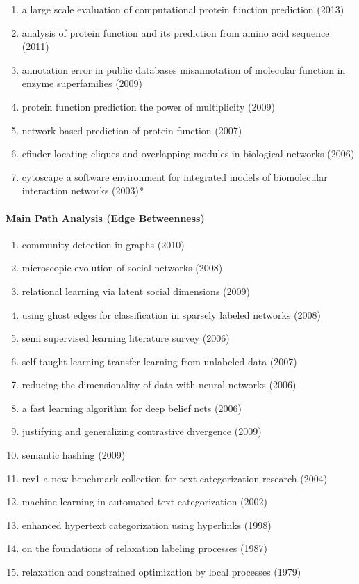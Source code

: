 \documentclass[lettepaper,]{article}
\providecommand{\tightlist}{%
  \setlength{\itemsep}{0pt}\setlength{\parskip}{0pt}}
\let\oldparagraph\paragraph
\renewcommand{\paragraph}[1]{\oldparagraph{#1}\mbox{}}
\begin{document}
\begin{enumerate}
\def\labelenumi{\arabic{enumi}.}
\tightlist
\item
  a large scale evaluation of computational protein function prediction
  (2013)
\item
  analysis of protein function and its prediction from amino acid
  sequence (2011)
\item
  annotation error in public databases misannotation of molecular
  function in enzyme superfamilies (2009)
\item
  protein function prediction the power of multiplicity (2009)
\item
  network based prediction of protein function (2007)
\item
  cfinder locating cliques and overlapping modules in biological
  networks (2006)
\item
  cytoscape a software environment for integrated models of biomolecular
  interaction networks (2003)*
\end{enumerate}

\hypertarget{main-path-analysis-edge-betweenness}{%
\paragraph{Main Path Analysis (Edge
Betweenness)}\label{main-path-analysis-edge-betweenness}}

\begin{enumerate}
\def\labelenumi{\arabic{enumi}.}
\tightlist
\item
  community detection in graphs (2010)
\item
  microscopic evolution of social networks (2008)
\item
  relational learning via latent social dimensions (2009)
\item
  using ghost edges for classification in sparsely labeled networks
  (2008)
\item
  semi supervised learning literature survey (2006)
\item
  self taught learning transfer learning from unlabeled data (2007)
\item
  reducing the dimensionality of data with neural networks (2006)
\item
  a fast learning algorithm for deep belief nets (2006)
\item
  justifying and generalizing contrastive divergence (2009)
\item
  semantic hashing (2009)
\item
  rcv1 a new benchmark collection for text categorization research
  (2004)
\item
  machine learning in automated text categorization (2002)
\item
  enhanced hypertext categorization using hyperlinks (1998)
\item
  on the foundations of relaxation labeling processes (1987)
\item
  relaxation and constrained optimization by local processes (1979)
\end{enumerate}
\end{document}
